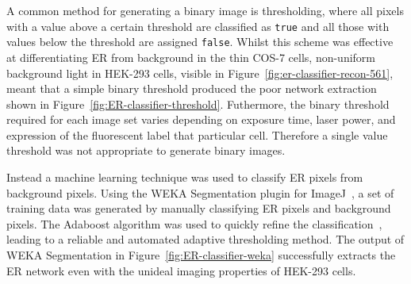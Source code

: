A common method for generating a binary image is thresholding, where all pixels with a value above a certain threshold are classified as \texttt{true} and all those with values below the threshold are assigned \texttt{false}. 
Whilst this scheme was effective at differentiating ER from background in the thin COS-7 cells, non-uniform background light in HEK-293 cells, visible in Figure~\ref{fig:er-classifier-recon-561}, meant that a simple binary threshold produced the poor network extraction shown in Figure~\ref{fig:ER-classifier-threshold}. 
Futhermore, the binary threshold required for each image set varies depending on exposure time, laser power, and expression of the fluorescent label that particular cell. 
Therefore a single value threshold was not appropriate to generate binary images. 

Instead a machine learning technique was used to classify ER pixels from background pixels. 
Using the WEKA Segmentation plugin for ImageJ~\cite{arganda2017trainable}, a set of training data was generated by manually classifying ER pixels and background pixels. 
The Adaboost algorithm was used to quickly refine the classification~\cite{freund1997decision, schapire1999brief}, leading to a reliable and automated adaptive thresholding method. 
The output of WEKA Segmentation in Figure~\ref{fig:ER-classifier-weka} successfully extracts the ER network even with the unideal imaging properties of HEK-293 cells. 

